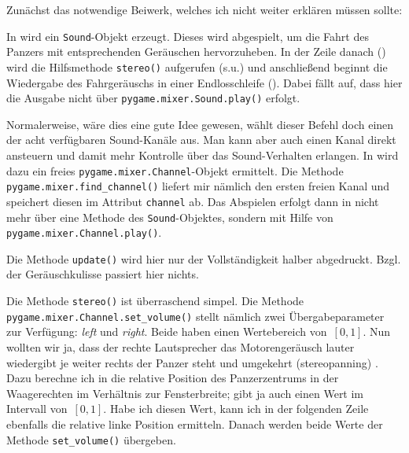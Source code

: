 Zunächst das notwendige Beiwerk, welches ich nicht weiter erklären müssen sollte:


In  wird ein \texttt{Sound}-Objekt erzeugt. Dieses wird abgespielt, um die Fahrt des Panzers mit entsprechenden Geräuschen hervorzuheben. In der Zeile danach () wird die Hilfsmethode \texttt{stereo()} aufgerufen (s.u.) und anschließend beginnt die Wiedergabe des Fahrgeräuschs in einer Endlosschleife (). Dabei fällt auf, dass hier die Ausgabe nicht über \texttt{pygame.mixer.Sound.play()} erfolgt. 

Normalerweise, wäre dies eine gute Idee gewesen, wählt dieser Befehl doch einen der acht verfügbaren Sound-Kanäle aus. Man kann aber auch einen Kanal direkt ansteuern und damit mehr Kontrolle über das Sound-Verhalten erlangen. In  wird dazu ein freies  \texttt{pygame.mixer.Channel}-Objekt ermittelt. Die Methode \texttt{pygame.mixer.find\-\_chan\-nel()}  liefert mir nämlich den ersten freien Kanal und speichert diesen im Attribut \texttt{channel} ab. Das Abspielen erfolgt dann in  nicht mehr über eine Methode des \texttt{Sound}-Objektes, sondern mit Hilfe von \texttt{pygame.mixer.Channel.play()}. 


Die Methode \texttt{update()} wird hier nur der Vollständigkeit halber abgedruckt. Bzgl. der Geräuschkulisse passiert hier nichts. 


Die Methode \texttt{stereo()} ist überraschend simpel. Die Methode \texttt{pygame.mixer.Channel\-.set\-\_vol\-ume()} stellt nämlich zwei Übergabeparameter zur Verfügung: \emph{left} und \emph{right}. Beide haben einen Wertebereich von~$[0, 1]$. Nun wollten wir ja, dass der rechte Lautsprecher das Motorengeräusch lauter wiedergibt je weiter rechts der Panzer steht und umgekehrt (\Gls{stereopanning}) . Dazu berechne ich in  die relative Position des Panzerzentrums in der Waagerechten im Verhältnis zur Fensterbreite; gibt ja auch einen Wert im Intervall von~$[0, 1]$. Habe ich diesen Wert, kann ich in der folgenden Zeile ebenfalls die relative linke Position ermitteln. Danach werden beide Werte der Methode \texttt{set\_volume()} übergeben. 

